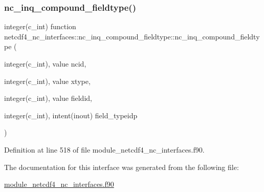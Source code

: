 \subsubsection{\texorpdfstring{nc\+\_\+inq\+\_\+compound\+\_\+fieldtype()}{nc\_inq\_compound\_fieldtype()}}
{\footnotesize\ttfamily integer(c\+\_\+int) function netcdf4\+\_\+nc\+\_\+interfaces\+::nc\+\_\+inq\+\_\+compound\+\_\+fieldtype\+::nc\+\_\+inq\+\_\+compound\+\_\+fieldtype (\begin{DoxyParamCaption}\item[{integer(c\+\_\+int), value}]{ncid,  }\item[{integer(c\+\_\+int), value}]{xtype,  }\item[{integer(c\+\_\+int), value}]{fieldid,  }\item[{integer(c\+\_\+int), intent(inout)}]{field\+\_\+typeidp }\end{DoxyParamCaption})}



Definition at line 518 of file module\+\_\+netcdf4\+\_\+nc\+\_\+interfaces.\+f90.



The documentation for this interface was generated from the following file\+:\begin{DoxyCompactItemize}
\item 
\hyperlink{module__netcdf4__nc__interfaces_8f90}{module\+\_\+netcdf4\+\_\+nc\+\_\+interfaces.\+f90}\end{DoxyCompactItemize}

